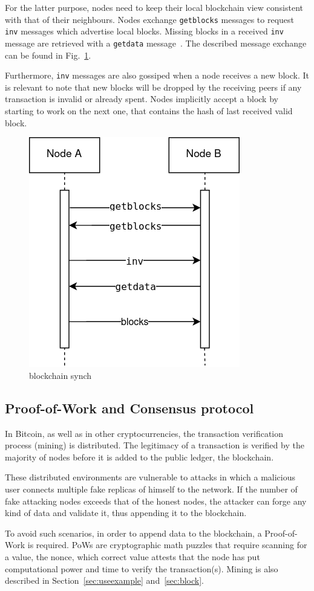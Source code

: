 \documentclass[12pt, letterpaper, twoside]{article}
\begin{document}
For the latter purpose, nodes need to keep their local blockchain view consistent with that of their neighbours. Nodes exchange \texttt{getblocks} messages to request \texttt{inv} messages which advertise local blocks. Missing blocks in a received \texttt{inv} message are retrieved with a \texttt{getdata} message~\cite{protocoldoc}. The described message exchange can be found in Fig.~\ref{fig:synch}.

Furthermore, \texttt{inv} messages are also gossiped when a node receives a new block. It is relevant to note that new blocks will be dropped by the receiving peers if any transaction is invalid or already spent. Nodes implicitly accept a block by starting to work on the next one, that contains the hash of last received valid block. 

\begin{figure}[h]
	\includegraphics[width=.35\textwidth]{pict/blockchain-synch.png}
	\centering
	\caption{blockchain synch}
	\label{fig:synch}
\end{figure}

\subsection{Proof-of-Work and Consensus protocol}\label{sec:consensus}
In Bitcoin, as well as in other cryptocurrencies, the transaction verification process (mining) is distributed. The legitimacy of a transaction is verified by the majority of nodes before it is added to the public ledger, the blockchain.

These distributed environments are vulnerable to attacks in which a malicious user connects multiple fake replicas of himself to the network. If the number of fake attacking nodes exceeds that of the honest nodes, the attacker can forge any kind of data and validate it, thus appending it to the blockchain.

To avoid such scenarios, in order to append data to the blockchain, a Proof-of-Work is required. PoWs are cryptographic math puzzles that require scanning for a value, the nonce, which correct value attests that the node has put computational power and time to verify the transaction(s). Mining is also described in Section~\ref{sec:useexample} and~\ref{sec:block}.
\end{document}
